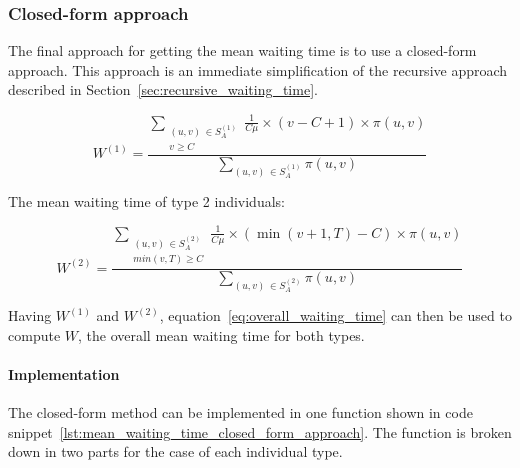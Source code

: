 \subsubsection{Closed-form approach}\label{sec:closed_form_waiting_time}

The final approach for getting the mean waiting time is to use a closed-form
approach.
This approach is an immediate simplification of the recursive approach
described in Section~\ref{sec:recursive_waiting_time}.

\begin{equation} \label{eq:closed_form_waiting_type_1}
    W^{(1)} = \frac{\sum_{\substack{(u,v) \, \in S_A^{(1)} \\ v \geq C}}
    \frac{1}{C \mu} \times (v-C+1) \times \pi(u,v)}{\sum_{(u,v) \,
    \in S_A^{(1)}} \pi(u,v)}
\end{equation}

The mean waiting time of type 2 individuals:

\begin{equation}\label{eq:closed_form_waiting_type_2}
    W^{(2)} = \frac{\sum_{\substack{(u,v) \, \in S_A^{(2)} \\ min(v,T) \geq C}}
    \frac{1}{C \mu} \times (\min(v+1,T)-C) \times \pi(u,v)}{\sum_{(u,v) \,
    \in S_A^{(2)}} \pi(u,v)}
\end{equation}

Having \(W^{(1)}\) and \(W^{(2)}\), equation~\eqref{eq:overall_waiting_time} can
then be used to compute \(W\), the overall mean waiting time for both types.


\paragraph{Implementation}\label{sec:waiting_closed_form_implementation}

The closed-form method can be implemented in one function shown
in code snippet~\ref{lst:mean_waiting_time_closed_form_approach}.
The function is broken down in two parts for the case of each individual type.


